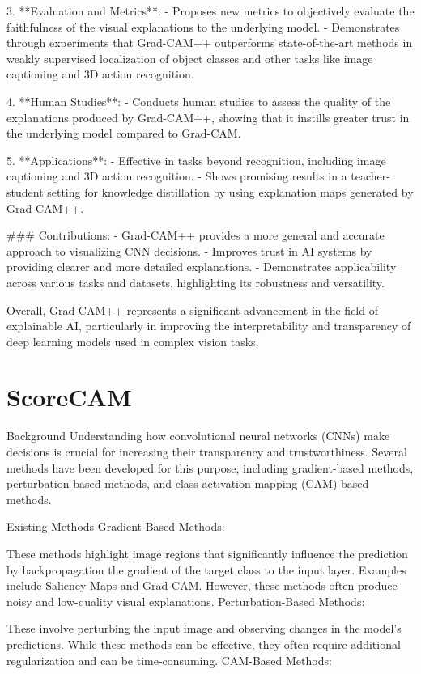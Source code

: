 3. **Evaluation and Metrics**:
   - Proposes new metrics to objectively evaluate the faithfulness of the visual explanations to the underlying model.
   - Demonstrates through experiments that Grad-CAM++ outperforms state-of-the-art methods in weakly supervised localization of object classes and other tasks like image captioning and 3D action recognition.

4. **Human Studies**:
   - Conducts human studies to assess the quality of the explanations produced by Grad-CAM++, showing that it instills greater trust in the underlying model compared to Grad-CAM.

5. **Applications**:
   - Effective in tasks beyond recognition, including image captioning and 3D action recognition.
   - Shows promising results in a teacher-student setting for knowledge distillation by using explanation maps generated by Grad-CAM++.

### Contributions:
- Grad-CAM++ provides a more general and accurate approach to visualizing CNN decisions.
- Improves trust in AI systems by providing clearer and more detailed explanations.
- Demonstrates applicability across various tasks and datasets, highlighting its robustness and versatility.

Overall, Grad-CAM++ represents a significant advancement in the field of explainable AI, particularly in improving the interpretability and transparency of deep learning models used in complex vision tasks.

\section{ScoreCAM}
Background
Understanding how convolutional neural networks (CNNs) make decisions is crucial for increasing their transparency and trustworthiness. Several methods have been developed for this purpose, including gradient-based methods, perturbation-based methods, and class activation mapping (CAM)-based methods.

Existing Methods
Gradient-Based Methods:

These methods highlight image regions that significantly influence the prediction by backpropagation the gradient of the target class to the input layer.
Examples include Saliency Maps and Grad-CAM. However, these methods often produce noisy and low-quality visual explanations.
Perturbation-Based Methods:

These involve perturbing the input image and observing changes in the model's predictions.
While these methods can be effective, they often require additional regularization and can be time-consuming.
CAM-Based Methods:


